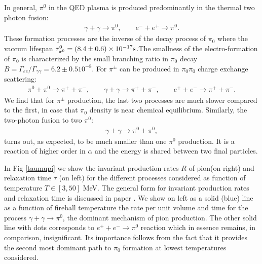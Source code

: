 \documentclass[Universe,article,submit,moreauthors,pdftex]{Definitions/mdpi}
\begin{document}
In general, $\pi^0$ in the QED plasma is produced predominantly in the thermal two photon fusion:
\begin{align}
\gamma+\gamma \rightarrow \pi^0 ,\qquad e^-+e^+ \rightarrow \pi^0. 
\end{align}
These formation processes are the inverse of the decay process of $\pi_0$ where the vaccum lifespan $\tau_{\pi^0}^0=(8.4\pm0.6)\times10^{-17} {\rm s}$.The smallness of the electro-formation of $\pi_0$ is characterized by the small  branching ratio in $\pi_0$ decay $B=\Gamma_{ee}/\Gamma_{\gamma\gamma}=6.2\pm 0.5 10^{-8}$.
For $\pi^{\pm}$ can be produced in $\pi_0\pi_0$ charge exchange scattering:
\begin{align}
\pi^0 + \pi^0 \rightarrow \pi^{+} + \pi^{-}, \qquad\gamma+\gamma \rightarrow \pi^{+} + \pi^{-}, \qquad
e^+ + e^- \rightarrow \pi^{+} + \pi^{-}. 
\end{align}
We find  that for $\pi^{\pm}$ production, the last two processes are much slower compared to the first, in case that $\pi_0$ density is near chemical equilibrium.
Similarly, the two-photon fusion to two $\pi^0$:
\begin{align}
\gamma + \gamma \rightarrow \pi^0 + \pi^0, \label{ggpi0pi0}
\end{align}
turns out, as expected, to be much smaller than one $\pi^0$ production. It is
a reaction of higher order in $\alpha$ and the energy is shared between two final particles.

In Fig \ref{taumupi} we show the invariant production rates $R$ of pion(on right) and relaxation time $\tau$ (on left) for the different processes considered as function of temperature $T\in [3,50]$ MeV. The general form for invariant production rates and relaxation time is discussed in paper \cite{Kuznetsova:2008jt}. We show on left as a solid (blue) line as a function of fireball temperature the rate per unit volume  and time for the process  $\gamma+\gamma\to \pi^0$, the dominant mechanism of pion production. The other solid line with dots corresponds to $e^++e^-\to \pi^0$ reaction which in essence remains, in comparison, insignificant. Its importance follows from the fact that it provides the second most dominant path to $\pi_0$ formation at lowest temperatures considered.
\end{document}
